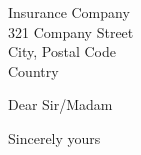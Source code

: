 \documentclass[10pt,a4paper]{letter}
\begin{document}
 
	\begin{letter}{Insurance Company\\ 321 Company Street\\City, Postal Code\\Country} 
		\opening{Dear Sir/Madam} 
	

		
		\closing{Sincerely yours} 
	\end{letter} 
\end{document}

